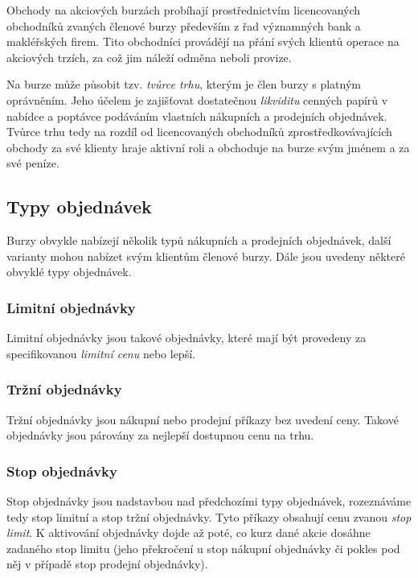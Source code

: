 \documentclass[thesis=M,czech]{FITthesis}[2012/06/26]
\begin{document}
Obchody na akciových burzách probíhají prostřednictvím licencovaných obchodníků zvaných členové burzy především 
z řad významných bank a makléřských firem. Tito obchodníci provádějí na přání svých klientů operace na akciových 
trzích, za což jim náleží odměna neboli provize.  \cite{prknab}

Na burze může působit tzv. \textit{tvůrce trhu}, kterým je člen burzy s platným oprávněním. Jeho účelem je zajišťovat 
dostatečnou \textit{likviditu} cenných papírů v nabídce a poptávce podáváním vlastních nákupních a prodejních objednávek. 
Tvůrce trhu tedy na rozdíl od licencovaných obchodníků zprostředkovávajících obchody za své klienty hraje aktivní 
roli a obchoduje na burze svým jménem a za své peníze.  \cite{htsmw} %

\subsection{Typy objednávek}

Burzy obvykle nabízejí několik typů nákupních a prodejních objednávek, další varianty mohou nabízet svým klientům 
členové burzy. Dále jsou uvedeny některé obvyklé typy objednávek. 

\subsubsection{Limitní objednávky}

Limitní objednávky jsou takové objednávky, které mají být provedeny za specifikovanou \textit{limitní cenu} nebo lepší.

\subsubsection{Tržní objednávky}

Tržní objednávky jsou nákupní nebo prodejní příkazy bez uvedení ceny. Takové objednávky jsou párovány za nejlepší 
dostupnou cenu na trhu. %

\subsubsection{Stop objednávky}

Stop objednávky jsou nadstavbou nad předchozími typy objednávek, rozeznáváme tedy stop limitní a 
stop tržní objednávky. Tyto příkazy obsahují cenu zvanou \textit{stop limit}. K aktivování objednávky dojde až poté, 
co kurz dané akcie dosáhne zadaného stop limitu (jeho překročení u stop nákupní objednávky či pokles pod něj 
v případě stop prodejní objednávky). %
\end{document}
